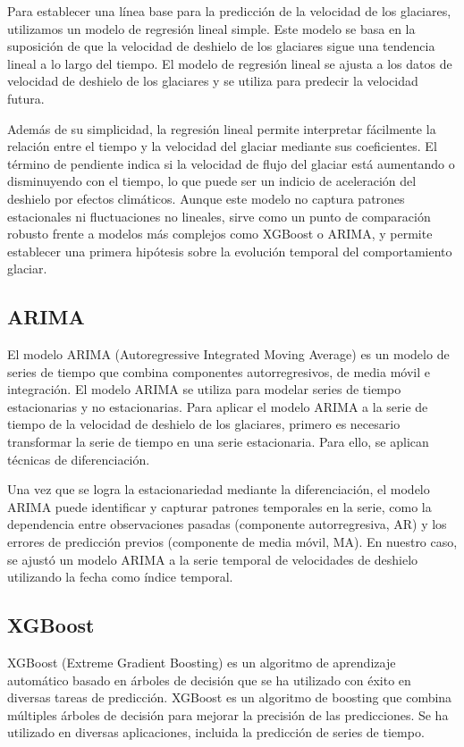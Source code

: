 \documentclass[sigconf,language=spanish]{acmart}
\begin{document}
Para establecer una línea base para la predicción de la velocidad de los glaciares, utilizamos un modelo de regresión lineal simple.
Este modelo se basa en la suposición de que la velocidad de deshielo de los glaciares sigue una tendencia lineal a lo largo del tiempo.
El modelo de regresión lineal se ajusta a los datos de velocidad de deshielo de los glaciares y se utiliza para predecir la velocidad futura.

Además de su simplicidad, la regresión lineal permite interpretar fácilmente la relación entre el tiempo y la velocidad del glaciar mediante sus coeficientes. 
El término de pendiente indica si la velocidad de flujo del glaciar está aumentando o disminuyendo con el tiempo, lo que puede ser un indicio
 de aceleración del deshielo por efectos climáticos. Aunque este modelo no captura patrones estacionales ni fluctuaciones no lineales, sirve como un punto 
 de comparación robusto frente a modelos más complejos como XGBoost o ARIMA, y permite establecer una primera hipótesis sobre la evolución
  temporal del comportamiento glaciar.

\subsection{ARIMA}

El modelo ARIMA (Autoregressive Integrated Moving Average) es un modelo de series de tiempo que combina componentes autorregresivos, de media móvil e integración.
El modelo ARIMA se utiliza para modelar series de tiempo estacionarias y no estacionarias.
Para aplicar el modelo ARIMA a la serie de tiempo de la velocidad de deshielo de los glaciares, primero es necesario transformar la serie de tiempo en una serie estacionaria.
Para ello, se aplican técnicas de diferenciación.

Una vez que se logra la estacionariedad mediante la diferenciación, el modelo ARIMA puede identificar y capturar patrones temporales en la serie, como la dependencia 
entre observaciones pasadas (componente autorregresiva, AR) y los errores de predicción previos (componente de media móvil, MA). En nuestro caso, se ajustó un modelo ARIMA a 
la serie temporal de velocidades de deshielo utilizando la fecha como índice temporal.

\subsection{XGBoost}

XGBoost (Extreme Gradient Boosting) es un algoritmo de aprendizaje automático basado en árboles de decisión que se ha utilizado con éxito en diversas tareas de predicción.
XGBoost es un algoritmo de boosting que combina múltiples árboles de decisión para mejorar la precisión de las predicciones.
Se ha utilizado en diversas aplicaciones, incluida la predicción de series de tiempo.
\end{document}
